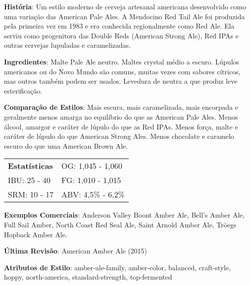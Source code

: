 \textbf{História}: Um estilo moderno de cerveja artesanal americana desenvolvido como uma variação das American Pale Ales. A Mendocino Red Tail Ale foi produzida pela primeira vez em 1983 e era conhecida regionalmente como Red Ale. Ela serviu como progenitora das Double Reds (American Strong Ale), Red IPAs e outras cervejas lupuladas e caramelizadas.

\textbf{Ingredientes}: Malte Pale Ale neutro. Maltes crystal médio a escuro. Lúpulos americanos ou do Novo Mundo são comuns, muitas vezes com sabores cítricos, mas outros também podem ser usados. Levedura de neutra a que produz leve esterificação.

\textbf{Comparação de Estilos}: Mais escura, mais caramelizada, mais encorpada e geralmente menos amarga no equilíbrio do que as American Pale Ales. Menos álcool, amargor e caráter de lúpulo do que as Red IPAs. Menos força, malte e caráter de lúpulo do que American Strong Ales. Menos chocolate e caramelo escuro do que uma American Brown Ale.

\begin{tabular}{@{}p{35mm}p{35mm}@{}}
  \textbf{Estatísticas} & OG: 1,045 - 1,060 \\
  IBU: 25 - 40  & FG: 1,010 - 1,015  \\
  SRM: 10 - 17  & ABV: 4,5\% - 6,2\%
\end{tabular}

\textbf{Exemplos Comerciais}: Anderson Valley Boont Amber Ale, Bell’s Amber Ale, Full Sail Amber, North Coast Red Seal Ale, Saint Arnold Amber Ale, Tröegs Hopback Amber Ale.

\textbf{Última Revisão}: American Amber Ale (2015)

\textbf{Atributos de Estilo}: amber-ale-family, amber-color, balanced, craft-style, hoppy, north-america, standard-strength, top-fermented
